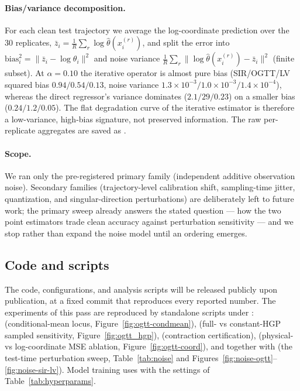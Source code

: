 \paragraph{Bias/variance decomposition.} For each clean test trajectory we average the log-coordinate
prediction over the $30$ replicates, $\bar z_i=\tfrac1R\sum_r\log\hat\theta(x_i^{(r)})$, and split the
error into $\mathrm{bias}^2_i=\|\bar z_i-\log\theta_i\|^2$ and noise variance
$\tfrac1R\sum_r\|\log\hat\theta(x_i^{(r)})-\bar z_i\|^2$ (finite subset). At $\alpha=0.10$ the iterative
operator is almost pure bias (SIR/OGTT/LV squared bias $0.94/0.54/0.13$, noise variance
$1.3{\times}10^{-3}/1.0{\times}10^{-3}/1.4{\times}10^{-4}$), whereas the direct regressor's variance
dominates ($2.1/29/0.23$) on a smaller bias ($0.24/1.2/0.05$). The flat degradation curve of the iterative
estimator is therefore a low-variance, high-bias signature, not preserved information. The raw per-replicate
aggregates are saved as .

\paragraph{Scope.} We ran only the pre-registered primary family (independent additive observation noise).
Secondary families (trajectory-level calibration shift, sampling-time jitter, quantization, and
singular-direction perturbations) are deliberately left to future work; the primary sweep already answers
the stated question --- how the two point estimators trade clean accuracy against perturbation sensitivity ---
and we stop rather than expand the noise model until an ordering emerges.

\subsection{Code and scripts}
\label{app:repro-code}

The code, configurations, and analysis scripts will be released publicly upon publication, at a fixed
commit that reproduces every reported number. The experiments of this pass are reproduced by standalone
scripts under :
 (conditional-mean locus, Figure~\ref{fig:ogtt-condmean}),
 (full- vs constant-HGP sampled sensitivity, Figure~\ref{fig:ogtt_hgp}),
 (contraction certification),
 (physical- vs log-coordinate MSE ablation, Figure~\ref{fig:ogtt-coord}), and
 together with  (the test-time perturbation sweep,
Table~\ref{tab:noise} and Figures~\ref{fig:noise-ogtt}--\ref{fig:noise-sir-lv}).
Model training uses  with the settings of Table~\ref{tab:hyperparams}.
